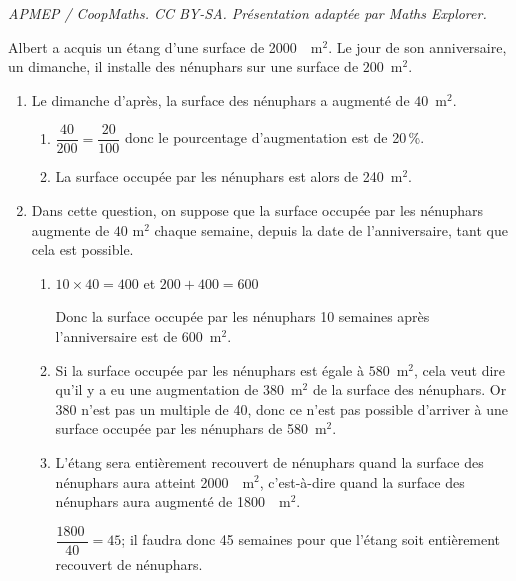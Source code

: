 \documentclass[10pt]{article}
\providecommand{\np}[2][]{{#2~#1}}
\begin{document}
\noindent\textit{APMEP / CoopMaths. CC BY-SA. Présentation adaptée par Maths Explorer.}\par\medskip
\medskip

Albert a acquis un étang d'une surface de \np{2000}~m$^2$.
Le jour de son anniversaire, un dimanche, il installe des nénuphars sur une surface de $200$~m$^2$.



\begin{enumerate}
\item Le dimanche d'après, la surface des nénuphars a augmenté de $40$~m$^2$.
	\begin{enumerate}
		\item 
$\dfrac{40}{200}=\dfrac{20}{100}$ donc le pourcentage d'augmentation est de 20\,\%.		
				\item La surface occupée par les nénuphars est alors de 240~m$^2$.
	\end{enumerate}














\item Dans cette question, on suppose que la surface occupée par les nénuphars augmente de $40$ m$^2$ chaque semaine, depuis la date de l'anniversaire, tant que cela est possible.
	\begin{enumerate}
		\item $10\times 40=400$ et $200+400=600$
		
Donc la surface occupée par les nénuphars 10 semaines après l'anniversaire est de 600~m$^2$.
		\item 
Si  la surface occupée par les nénuphars est égale à $580$~m$^2$, cela veut dire qu'il y a eu une augmentation de 380~m$^2$ de la surface des nénuphars. Or 380 n'est pas un multiple de 40, donc ce n'est pas possible d'arriver à une surface occupée par les nénuphars de 580~m$^2$.
		
		\item
L'étang sera  entièrement recouvert de nénuphars quand la surface des nénuphars aura atteint \np{2000}~m$^2$, c'est-à-dire quand la surface des nénuphars aura augmenté de \np{1800}~m$^2$.

$\dfrac{\np{1800}}{40}=45$; il faudra donc 45 semaines pour que l'étang soit entièrement recouvert de nénuphars.
		

\end{enumerate}
\end{enumerate}
\end{document}
